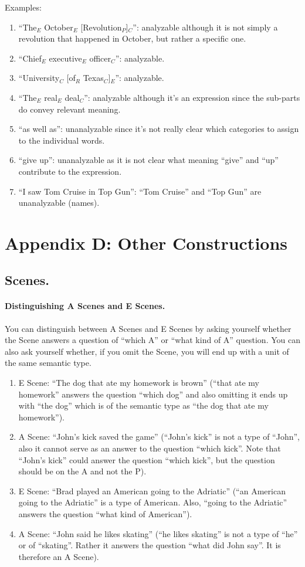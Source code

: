 \documentclass[11pt]{article}
\newcommand{\be}{\begin{enumerate}}
\newcommand{\ee}{\end{enumerate}}
\begin{document}
Examples:

\begin{enumerate}
\item
``The$_E$ October$_E$ [Revolution$_P$]$_C$'': analyzable although it is not
simply a revolution that happened in October, but rather a specific one.
\item
``Chief$_E$ executive$_E$ officer$_C$'': analyzable.
\item
``University$_C$ [of$_R$ Texas$_C$]$_E$'': analyzable.
\item
``The$_E$ real$_E$ deal$_C$'': analyzable although it's an expression
since the sub-parts do convey relevant meaning.
\item
``as well as'': unanalyzable since it's not really clear which
categories to assign to the individual words.
\item
``give up'': unanalyzable as it is not clear what meaning ``give'' and ``up'' contribute to the expression.
\item
``I saw Tom Cruise in Top Gun'': ``Tom Cruise'' and ``Top Gun'' are unanalyzable (names).
\end{enumerate}


\section{\large Appendix D: Other Constructions}


\subsection{Scenes.}

\paragraph{Distinguishing A Scenes and E Scenes.} You can distinguish between A Scenes
and E Scenes by asking yourself whether the Scene answers a question of
``which A'' or ``what kind of A'' question. You can also ask yourself whether,
if you omit the Scene, you will end up with a unit of the same semantic
type.
\be
\item
E Scene: ``The dog that ate my homework is brown'' (``that ate my homework''
answers the question ``which dog'' and also omitting it ends up with ``the
dog'' which is of the semantic type as ``the dog that ate my homework'').
\item
A Scene: ``John's kick saved the game'' (``John's kick'' is not a type of
``John'', also it cannot serve as an answer to the question ``which kick''.
Note that ``John's kick'' could answer the question ``which kick'', but the
question should be on the A and not the P).
\item
E Scene: ``Brad played an American going to the Adriatic'' (``an American
going to the Adriatic'' is a type of American. Also, ``going to the Adriatic''
answers the question ``what kind of American'').
\item
A Scene: ``John said he likes skating'' (``he likes skating'' is not a type of
``he'' or of ``skating''. Rather it answers the question ``what did John say''.
It is therefore an A Scene).
\ee
\end{document}

